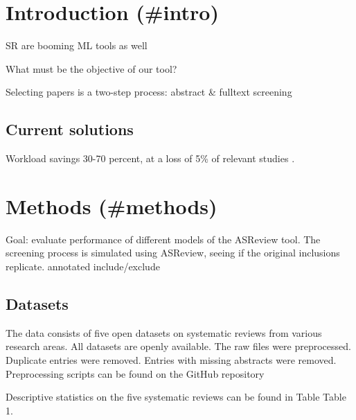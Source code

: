 \documentclass[
]{book}
\begin{document}
\hypertarget{introduction-intro}{%
\chapter{Introduction (\#intro)}\label{introduction-intro}}

SR are booming
ML tools as well

\citep{PRISMA-PGroup2015}

What must be the objective of our tool?

Selecting papers is a two-step process: abstract \& fulltext screening

\hypertarget{current-solutions}{%
\section{Current solutions}\label{current-solutions}}

Workload savings 30-70 percent, at a loss of 5\% of relevant studies \citep{Omara-Eves2015}.

\hypertarget{methods-methods}{%
\chapter{Methods (\#methods)}\label{methods-methods}}

Goal: evaluate performance of different models of the ASReview tool.
The screening process is simulated using ASReview, seeing if the original inclusions replicate.
annotated include/exclude

\hypertarget{datasets}{%
\section{Datasets}\label{datasets}}

The data consists of five open datasets on systematic reviews from various research areas.
All datasets are openly available.
The raw files were preprocessed. Duplicate entries were removed.
Entries with missing abstracts were removed.
Preprocessing scripts can be found on the GitHub repository

Descriptive statistics on the five systematic reviews can be found in Table Table 1.
\end{document}
